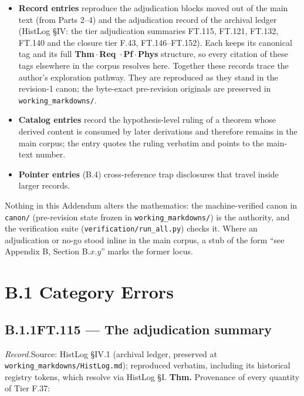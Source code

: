 \documentclass[11pt,openany]{report}
\theoremstyle{canonplain}
\theoremstyle{canondef}
\begin{document}
\begin{itemize}
\item \textbf{Record entries} reproduce the adjudication blocks moved out of
  the main text (from Parts 2--4) and the adjudication record of the archival
  ledger (HistLog \S IV: the tier adjudication summaries FT.115, FT.121,
  FT.132, FT.140 and the closure tier F.43, FT.146--FT.152). Each keeps its
  canonical tag and its full \textbf{Thm}\,$\cdot$\,\textbf{Req}\,%
  $\cdot$\,\textbf{Pf}\,$\cdot$\,\textbf{Phys} structure, so every citation of
  these tags elsewhere in the corpus resolves here. Together these records
  trace the author's exploration pathway. They are reproduced as they stand in
  the revision-1 canon; the byte-exact pre-revision originals are preserved in
  \texttt{working\_markdowns/}.
\item \textbf{Catalog entries} record the hypothesis-level ruling of a theorem
  whose derived content is consumed by later derivations and therefore remains
  in the main corpus; the entry quotes the ruling verbatim and points to the
  main-text number.
\item \textbf{Pointer entries} (B.4) cross-reference trap disclosures that
  travel inside larger records.
\end{itemize}

Nothing in this Addendum alters the mathematics: the machine-verified canon in
\texttt{canon/} (pre-revision state frozen in \texttt{working\_markdowns/}) is the
authority, and the verification suite (\texttt{verification/run\_all.py}) checks it. Where an adjudication
or no-go stood inline in the main corpus, a stub of the form ``see Appendix B,
Section B.$x$.$y$'' marks the former locus.

\section*{\texorpdfstring{B.1 Category Errors}{B.1 Category Errors}}
\subsection*{\texorpdfstring{B.1.1\quad FT.115 — The adjudication summary}{FT.115 B.1.1}}
\label{tag:FT-115}
{\small \textit{Record.}\quad Source: HistLog §IV.1 (archival ledger, preserved at \texttt{working\_markdowns/HistLog.md}); reproduced verbatim, including its historical registry tokens, which resolve via HistLog \S I.}
\medskip
\textbf{Thm.} Provenance of every quantity of Tier F.37:
\end{document}
